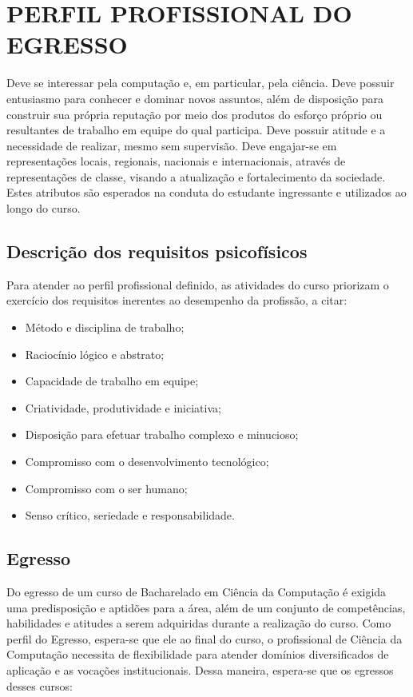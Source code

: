 \chapter{PERFIL PROFISSIONAL DO EGRESSO}

Deve se interessar pela computação e, em particular, pela ciência. Deve possuir entusiasmo para conhecer e dominar novos assuntos, além de disposição para construir sua própria reputação por meio dos produtos do esforço próprio ou resultantes de trabalho em equipe do qual participa. Deve possuir atitude e a necessidade de realizar, mesmo sem supervisão. Deve engajar-se em representações locais, regionais, nacionais e internacionais, através de representações de classe, visando a atualização e fortalecimento da sociedade. Estes atributos são esperados na conduta do estudante ingressante e utilizados ao longo do curso.

\section{Descrição dos requisitos psicofísicos}

Para atender ao perfil profissional definido, as atividades do curso priorizam o exercício dos requisitos inerentes ao desempenho da profissão, a citar:

\begin{itemize}
    \item Método e disciplina de trabalho;
    \item Raciocínio lógico e abstrato;
    \item Capacidade de trabalho em equipe;
    \item Criatividade, produtividade e iniciativa;
    \item Disposição para efetuar trabalho complexo e minucioso;
    \item Compromisso com o desenvolvimento tecnológico;
    \item Compromisso com o ser humano;
    \item Senso crítico, seriedade e responsabilidade.
\end{itemize}

\section{Egresso}

Do egresso de um curso de Bacharelado em Ciência da Computação é exigida uma predisposição e aptidões para a área, além de um conjunto de competências, habilidades e atitudes a serem adquiridas durante a realização do curso. Como perfil do Egresso, espera-se que ele ao final do curso, o profissional de Ciência da Computação necessita de flexibilidade para atender domínios diversificados de aplicação e as vocações institucionais. Dessa maneira, espera-se que os egressos desses cursos:

